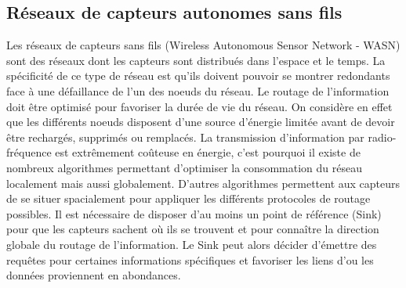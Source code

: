 \documentclass[10pt, conference, compsocconf]{llncs}
\begin{document}
		\subsection{Réseaux de capteurs autonomes sans fils}
			Les réseaux de capteurs sans fils (Wireless Autonomous Sensor Network - WASN) sont des réseaux dont les capteurs sont distribués dans l'espace et le temps. La spécificité de ce type de réseau est qu'ils doivent pouvoir se montrer redondants face à une défaillance de l'un des noeuds du réseau. Le routage de l'information doit être optimisé pour favoriser la durée de vie du réseau. On considère en effet que les différents noeuds disposent d'une source d'énergie limitée avant de devoir être rechargés, supprimés ou remplacés. La transmission d'information par radio-fréquence est extrêmement coûteuse en énergie, c'est pourquoi il existe de nombreux algorithmes permettant d'optimiser la consommation du réseau localement mais aussi globalement. D'autres algorithmes permettent aux capteurs de se situer spacialement pour appliquer les différents protocoles de routage possibles. Il est nécessaire de disposer d'au moins un point de référence (Sink) pour que les capteurs sachent où ils se trouvent et pour connaître la direction globale du routage de l'information. Le Sink peut alors décider d'émettre des requêtes pour certaines informations spécifiques et favoriser les liens d'ou les données proviennent en abondances.\\
\end{document}
